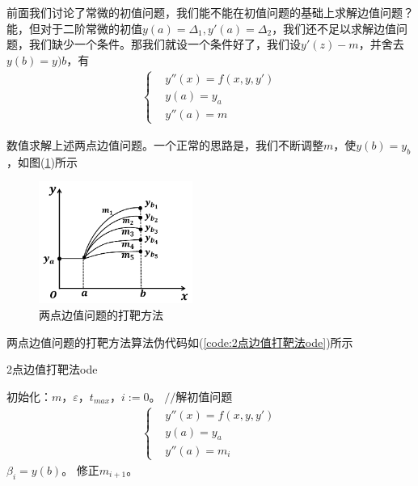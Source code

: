             前面我们讨论了常微的初值问题，我们能不能在初值问题的基础上求解边值问题？能，但对于二阶常微的初值$y(a) = \Delta_1,y'(a) = \Delta_2$，我们还不足以求解边值问题，我们缺少一个条件。那我们就设一个条件好了，我们设$y'(z) - m$，并舍去$y(b)=y)b$，有
            \begin{align*}
            \left\{
            \begin{aligned}
            & y''(x) = f(x,y,y')\\
            & y(a) = y_a\\
            & y''(a) = m
            \end{aligned}
            \right.
            \end{align*}
            \par
            数值求解上述两点边值问题。一个正常的思路是，我们不断调整$m$，使$y(b) = y_b$，如图(\ref{fig:两点边值问题的打靶方法})所示
            \begin{figure}[H]
            \centering
            \includegraphics[height=4cm]{images/two_point.jpg}
            \caption{两点边值问题的打靶方法}
            \label{fig:两点边值问题的打靶方法}
            \end{figure}
            两点边值问题的打靶方法算法伪代码如(\ref{code:2点边值打靶法ode})所示
            \begin{algorithm}[htbp]
                \caption{2点边值打靶法ode}\label{code:2点边值打靶法ode}
                \begin{algorithmic}[1]
                    \State 初始化：$m$，$\varepsilon$，$t_{max}$，$i:=0$。
                        \State $//$解初值问题
                        \begin{align*}
                        \left\{
                        \begin{aligned}
                        & y''(x) = f(x,y,y')\\
                        & y(a) = y_a\\
                        & y''(a) = m_i
                        \end{aligned}
                        \right.
                        \end{align*}
                        \State $\beta _i = y(b)$。
                            \State 修正$m_{i+1}$。
                        \EndIf
                    \EndWhile
                \end{algorithmic}
            \end{algorithm}
